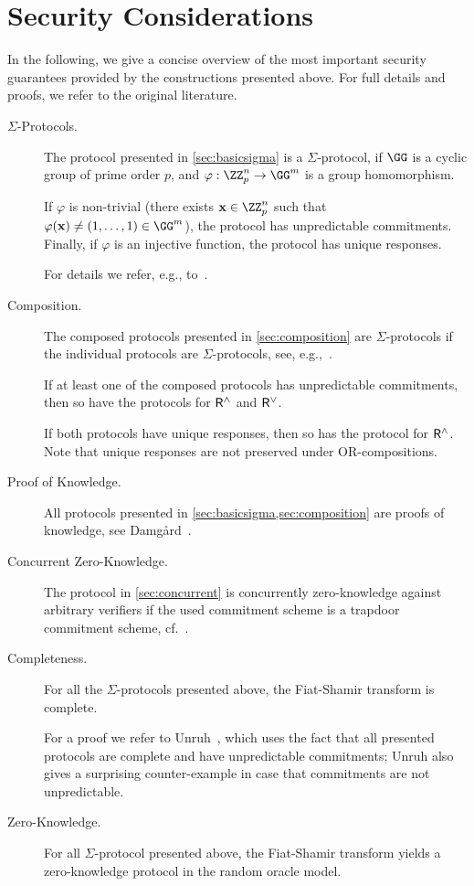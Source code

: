 \documentclass[runningheads]{llncs}
\begin{document}
\section{Security Considerations}

In the following, we give a concise overview of the most important security guarantees provided by the constructions presented above.
For full details and proofs, we refer to the original literature.

\begin{description}
  \item[$\Sigma$-Protocols.]
  The protocol presented in \cref{sec:basicsigma} is a $\Sigma$-protocol, if $\GG$ is a cyclic group of prime order $p$, and $\varphi:\ZZ_p^n\to\GG^m$ is a group homomorphism.

  If $\varphi$ is non-trivial (there exists $\vec x\in\ZZ_p^n$ such that $\varphi(\vec x)\ne (1,\dots,1)\in\GG^m$), the protocol has unpredictable commitments.
  Finally, if $\varphi$ is an injective function, the protocol has unique responses.

  For details we refer, e.g., to~\cite{cramer97}.

  \item[Composition.]
    The composed protocols presented in \cref{sec:composition} are $\Sigma$-protocols if the individual protocols are $\Sigma$-protocols, see, e.g.,~\cite{C:CraDamSch94}.

  If at least one of the composed protocols has unpredictable commitments, then so have the protocols for $\mathsf{R}^\land$ and $\mathsf{R}^\lor$.

  If both protocols have unique responses, then so has the protocol for $\mathsf{R}^\land$.
  Note that unique responses are not preserved under OR-compositions.

  \item[Proof of Knowledge.]
    All protocols presented in \cref{sec:basicsigma,sec:composition} are proofs of knowledge, see Damg\r{a}rd~\cite{damgard04}.
  \item[Concurrent Zero-Knowledge.]
    The protocol in \cref{sec:concurrent} is concurrently zero-knowledge against arbitrary verifiers if the used commitment scheme is a trapdoor commitment scheme, cf.~\cite{EC:Damgard00}.
%
  \item[Completeness.]
    For all the $\Sigma$-protocols presented above, the Fiat-Shamir transform is complete.


    For a proof we refer to Unruh~\cite{AC:Unruh17}, which uses the fact that all presented protocols are complete and have unpredictable commitments;
    Unruh also gives a surprising counter-example in case that commitments are not unpredictable.
  \item[Zero-Knowledge.]
    For all $\Sigma$-protocol presented above, the Fiat-Shamir transform yields a zero-knowledge protocol in the random oracle model.


\end{description}
\end{document}
